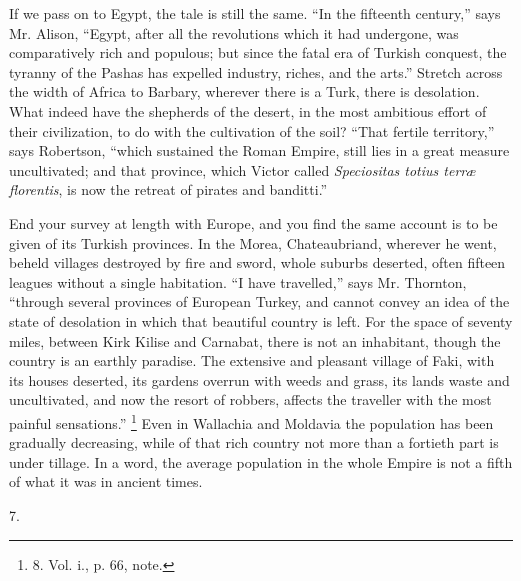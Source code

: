 If we pass on to Egypt, the
tale is still the same. ``In the fifteenth century,'' says Mr. Alison, ``Egypt,
after all the revolutions which it had undergone, was comparatively
rich and populous; but since the fatal era of Turkish conquest, the
tyranny of the Pashas has expelled industry, riches, and the arts.''
Stretch across the width of Africa to Barbary, wherever there is a
Turk, there is desolation. What indeed have the shepherds of the
desert, in the most ambitious effort of their civilization, to do with
the cultivation of the soil? ``That fertile territory,'' says Robertson,
``which sustained the Roman Empire, still lies in a great measure
uncultivated; and that province, which Victor called \emph{Speciositas
totius terræ florentis}, is now the retreat of pirates and
banditti.''

End your survey at length with
Europe, and you find the same account is to be given of its Turkish
provinces. In the Morea, Chateaubriand, wherever he went, beheld
villages destroyed by fire and sword, whole suburbs deserted, often
fifteen leagues without a single habitation. ``I have travelled,'' says
Mr. Thornton, ``through several provinces of European Turkey, and
cannot convey an idea of the state of desolation in which that
beautiful country is left. For the space of seventy miles, between
Kirk Kilise and Carnabat, there is not an inhabitant, though the
country is an earthly paradise. The extensive and pleasant village of
Faki, with its houses deserted, its gardens overrun with weeds and
grass, its lands waste and uncultivated, and now the resort of
robbers, affects the traveller with the most painful sensations.''
\footnote{8.
Vol. i., p. 66, note.} Even in Wallachia and
Moldavia the population has been gradually decreasing, while of that
rich country not more than a fortieth part is under tillage. In a
word, the average population in the whole Empire is not a fifth of
what it was in ancient times.

7.

